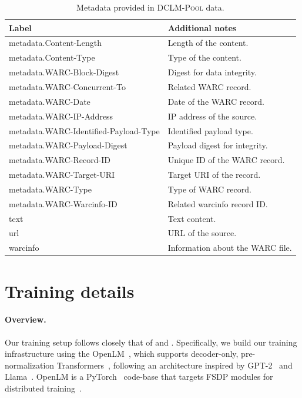 \documentclass{article}
\newcommand{\rawpool}{\textsc{DCLM-Pool}\xspace}
\begin{document}
\begin{table}[h]
    \centering
    \caption{Metadata provided in \rawpool data.}
    \label{tab:raw_pool_meta}
\begingroup
\renewcommand{\arraystretch}{1.3}
    \begin{tabular}{ll}
        \toprule
        Label & Additional notes
        \\
        \midrule
         metadata.Content-Length & Length of the content. \\
        metadata.Content-Type & Type of the content. \\ \midrule
        metadata.WARC-Block-Digest & Digest for data integrity. \\
         metadata.WARC-Concurrent-To & Related WARC record. \\
         metadata.WARC-Date & Date of the WARC record. \\
        metadata.WARC-IP-Address & IP address of the source. \\
         metadata.WARC-Identified-Payload-Type & Identified payload type. \\
        metadata.WARC-Payload-Digest & Payload digest for integrity. \\
        metadata.WARC-Record-ID & Unique ID of the WARC record. \\
         metadata.WARC-Target-URI & Target URI of the record. \\
         metadata.WARC-Type & Type of WARC record. \\
         metadata.WARC-Warcinfo-ID & Related warcinfo record ID. \\ \midrule
         text & Text content. \\
         url & URL of the source. \\
       warcinfo & Information about the WARC file.
       \\
       \bottomrule
    \end{tabular}
    \endgroup

\end{table}

\section{Training details}
\label{appx:training}

\paragraph{Overview.}
Our training setup follows closely that of \citet{wortsman2023small} and \citet{gadre2024LanguageMS}.
Specifically, we build our training infrastructure using the OpenLM~\citep{open_lm}, which supports decoder-only, pre-normalization Transformers~\citep{transformer}, following an architecture inspired by GPT-2~\citep{Radford2019LanguageMA} and Llama~\citep{llama}.
OpenLM is a PyTorch~\citep{paszke2019pytorch,pytorch2} code-base that targets FSDP modules for distributed training~\citep{Zhao2023PyTorchFE}.
\end{document}
